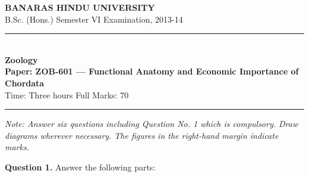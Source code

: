 \documentclass[11pt,a4paper]{article}
\begin{document}
\begin{center}
  {\large\bfseries BANARAS HINDU UNIVERSITY}\\[2pt]
  {\normalsize B.Sc. (Hons.) Semester VI Examination, 2013-14}\\[6pt]
  \rule{0.8\linewidth}{0.5pt}\\[6pt]
  {\large\bfseries Zoology}\\[4pt]
  {\large\bfseries Paper: ZOB-601 --- Functional Anatomy and Economic Importance of Chordata}\\[4pt]
  {\normalsize Time: Three hours \hfill Full Marks: 70}
\end{center}

\rule{\linewidth}{0.4pt}

\smallskip



\noindent   \textit{Note: Answer six questions including Question No. 1 which is compulsory. Draw diagrams wherever necessary. The figures in the right-hand margin indicate marks.}

\bigskip

\medskip


\noindent   \textbf{Question 1.} Answer the following parts:
\end{document}

